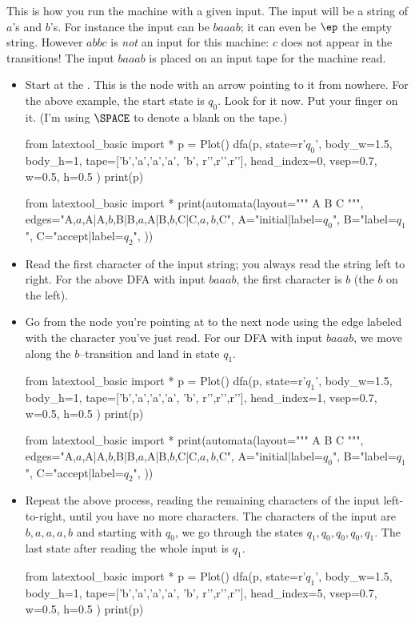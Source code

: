 This is how you run the machine with a given input.
The input will be a string of $a$'s and $b$'s.
For instance the input can be $baaab$; it can even be $\ep$ the empty string.
However $abbc$ is \textit{not} an input for this machine: $c$ does not
appear in the transitions! 
The input $baaab$ is placed on an input tape for the machine read.
\begin{itemize}
 \item Start at the . This is the node with an arrow
 pointing to it from nowhere.
 For the above example, the start state is $q_0$.
 Look for it now. Put your finger on it.
 (I'm using $\SPACE$ to denote a blank on the tape.)
\begin{python}
from latextool_basic import *
p = Plot()
dfa(p,
state=r'$q_0$',
body_w=1.5, body_h=1,
tape=['b','a','a','a', 'b', r'\SPACE',r'\SPACE',r'\SPACE'],
head_index=0,
vsep=0.7,
w=0.5, h=0.5
)
print(p)
\end{python}
\begin{python}
from latextool_basic import *
print(automata(layout="""
A  B  C
""",
edges="A,$a$,A|A,$b$,B|B,$a$,A|B,$b$,C|C,$a,b$,C",
A="initial|label=$q_0$",
B="label=$q_1$",
C="accept|label=$q_2$",
))
\end{python}

 \item Read the first character of the input string; you always read the string
 left to right. For the above DFA with input $baaab$, the first character is
 $b$ (the $b$ on the left).

 \item Go from the node you're pointing at to the next node using
 the edge labeled with the character you've just read.
 For our DFA with input $baaab$, we move along the $b$--transition
 and land in state $q_1$.
 \begin{python}
from latextool_basic import *
p = Plot()
dfa(p,
state=r'$q_1$',
body_w=1.5, body_h=1,
tape=['b','a','a','a', 'b', r'\SPACE',r'\SPACE',r'\SPACE'],
head_index=1,
vsep=0.7,
w=0.5, h=0.5
)
print(p)
\end{python}
\begin{python}
from latextool_basic import *
print(automata(layout="""
A  B  C
""",
edges="A,$a$,A|A,$b$,B|B,$a$,A|B,$b$,C|C,$a,b$,C",
A="initial|label=$q_0$",
B="label=$q_1$",
C="accept|label=$q_2$",
))
\end{python}


 \item Repeat the above process, reading the remaining characters
 of the input left-to-right, until you have no more characters.
 The characters of the input are $b, a, a, a, b$ and starting with $q_0$,
 we go through the states $q_1, q_0, q_0, q_0, q_1$.
 The last state after reading the whole input is $q_1$.
 \begin{python}
from latextool_basic import *
p = Plot()
dfa(p,
state=r'$q_1$',
body_w=1.5, body_h=1,
tape=['b','a','a','a', 'b', r'\SPACE',r'\SPACE',r'\SPACE'],
head_index=5,
vsep=0.7,
w=0.5, h=0.5
)
print(p)
\end{python}


\end{itemize}

